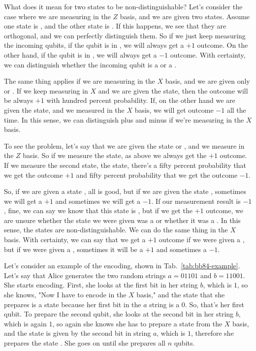 What does it mean for two states to be non-distinguishable? Let's consider the case where we are measuring in the $Z$ basis, and we are given two states. Assume one state is , and the other state is . If this happens, we see that they are orthogonal, and we can perfectly distinguish them. So if we just keep measuring the incoming qubits, if the qubit is in , we will always get a $+1$ outcome. On the other hand, if the qubit is in , we will always get a $-1$ outcome. With certainty, we can distinguish whether the incoming qubit is a  or a .

The same thing applies if we are measuring in the $X$ basis, and we are given only \ket{+} or \ket{-}. If we keep measuring in $X$ and we are given the \ket{+} state, then the outcome will be always $+1$ with hundred percent probability. If, on the other hand we are given the \ket{-} state, and we measured in the $X$ basis, we will get outcome $-1$ all the time. In this sense, we can distinguish plus and minus if we're measuring in the $X$ basis.

To see the problem, let's say that we are given the state  or \ket{+}, and we measure in the $Z$ basis. So if we measure the  state, as above we always get the $+1$ outcome. If we measure the second state, the \ket{+} state, there's a fifty percent probability that we get the outcome $+1$ and fifty percent probability that we get the outcome $-1$.

So, if we are given a state , all is good, but if we are given the state \ket{+}, sometimes we will get a $+1$ and sometimes we will get a $-1$. If our measurement result is $-1$, fine, we can say we know that this state is \ket{+}, but if we get the $+1$ outcome, we are unsure whether the state we were given was a \ket{+} or whether it was a . In this sense, the states are non-distinguishable. We can do the same thing in the $X$ basis. With certainty, we can say that we get a $+1$ outcome if we were given a \ket{+}, but if we were given a , sometimes it will be a $+1$ and sometimes a $-1$.

Let's consider an example of the encoding, shown in Tab.~\ref{tab:bb84-example}. Let's say that Alice generates the two random strings $a = 01101$ and $b=11001$. She starts encoding.  First, she looks at the first bit in her string $b$, which is $1$, so she knows, "Now I have to encode in the $X$ basis," and the state that she prepares is a \ket{+} state because her first bit in the $a$ string is a $0$. So, that's her first qubit. To prepare the second qubit, she looks at the second bit in her string $b$, which is again $1$, so again she knows she has to prepare a state from the $X$ basis, and the state is given by the second bit in string $a$, which is $1$, therefore she prepares the state \ket{-}. She goes on until she prepares all $n$ qubits.

